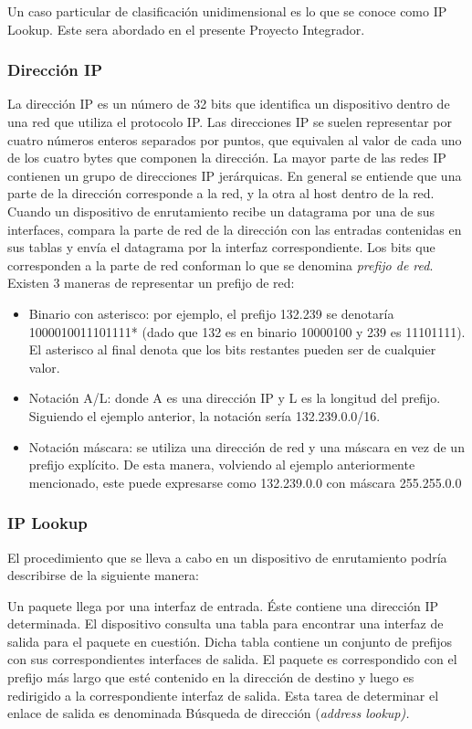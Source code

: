 Un caso particular de clasificación unidimensional es lo que se conoce como IP Lookup. Este sera abordado en el presente Proyecto Integrador.

\subsubsection{Dirección IP}

La dirección IP es un número de 32 bits que identifica un dispositivo dentro de una red que utiliza el protocolo IP. Las direcciones IP se suelen representar por cuatro números enteros separados por puntos, que equivalen al valor de cada uno de los cuatro bytes que componen la dirección.
La mayor parte de las redes IP contienen un grupo de direcciones IP jerárquicas. En general se entiende que una parte de la dirección corresponde a la red, y la otra al host dentro de la red. Cuando un dispositivo de enrutamiento recibe un datagrama por una de sus interfaces, compara la parte de red de la dirección con las entradas contenidas en sus tablas y envía el datagrama por la interfaz correspondiente.
Los bits que corresponden a la parte de red conforman lo que se denomina \textit{prefijo de red}.
Existen 3 maneras de representar un prefijo de red:

\begin{itemize}
	\item Binario con asterisco: por ejemplo, el prefijo 132.239 se denotaría 1000010011101111* (dado que 132 es en binario 10000100 y 239 es 11101111). El asterisco al final denota que los bits restantes pueden ser de cualquier valor.
	\item Notación A/L: donde A es una dirección IP y L es la longitud del prefijo. Siguiendo el ejemplo anterior, la notación sería 132.239.0.0/16.
	\item Notación máscara: se utiliza una dirección de red y una máscara en vez de un prefijo explícito. De esta manera, volviendo al ejemplo anteriormente mencionado, este puede expresarse como 132.239.0.0 con máscara 255.255.0.0
\end{itemize}

\subsubsection{IP Lookup}

El procedimiento que se lleva a cabo en un dispositivo de enrutamiento podría describirse de la siguiente manera:

Un paquete llega por una interfaz de entrada. Éste contiene una dirección IP determinada. El dispositivo consulta una tabla para encontrar una interfaz de salida para el paquete en cuestión. Dicha tabla contiene un conjunto de prefijos con sus correspondientes interfaces de salida. El paquete es correspondido con el prefijo más largo que esté contenido en la dirección de destino y luego es redirigido  a la correspondiente interfaz de salida. Esta tarea de determinar el enlace de salida es denominada Búsqueda de dirección (\textit{address lookup).}

